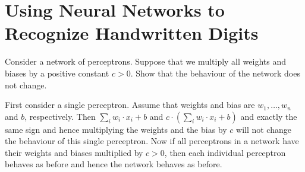 \chapter{Using Neural Networks to Recognize Handwritten Digits}

\begin{exercise} Consider a network of perceptrons. Suppose that
we multiply all weights and biases by a positive constant $c > 0$. Show 
that the behaviour of the network does not change.
\end{exercise}
\begin{solution}
First consider a single perceptron. Assume that weights and bias are $w_1, \ldots, w_n$ and $b$, respectively. Then $\sum_i w_i \cdot x_i + b$ and 
$c \cdot (\sum_i w_i \cdot x_i + b)$ and exactly the same sign and hence multiplying the weights and the bias by $c$ will not change the behaviour of this single perceptron. Now if all perceptrons in a network have their weights 
and biases multiplied by $c > 0$, then each individual perceptron behaves as before and hence the network behaves as before.
\end{solution}

